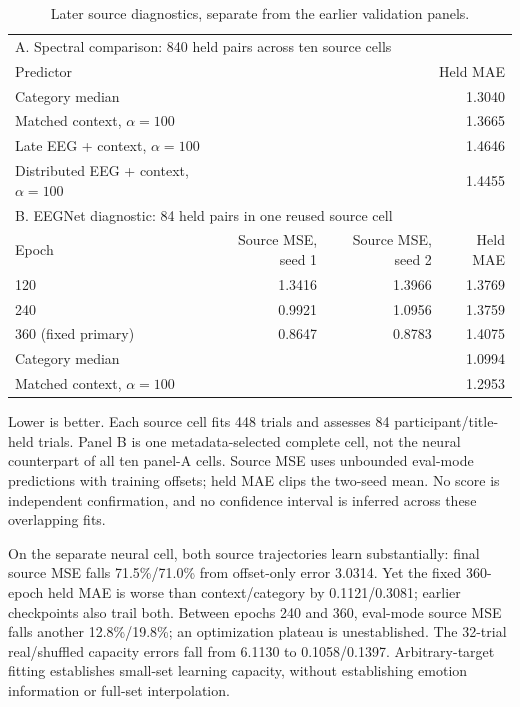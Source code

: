 \documentclass[10pt,letterpaper]{article}
\begin{document}
\begin{table}[!htbp]
\centering\small
\caption{Later source diagnostics, separate from the earlier validation panels.}
\label{tab:sourcefollowup}
\begin{tabular}{lrrr}
\toprule
\multicolumn{4}{l}{A. Spectral comparison: 840 held pairs across ten source cells}\\
Predictor & \multicolumn{3}{r}{Held MAE}\\
\midrule
Category median & \multicolumn{3}{r}{1.3040}\\
Matched context, $\alpha=100$ & \multicolumn{3}{r}{1.3665}\\
Late EEG + context, $\alpha=100$ & \multicolumn{3}{r}{1.4646}\\
Distributed EEG + context, $\alpha=100$ & \multicolumn{3}{r}{1.4455}\\
\midrule
\multicolumn{4}{l}{B. EEGNet diagnostic: 84 held pairs in one reused source cell}\\
Epoch & Source MSE, seed 1 & Source MSE, seed 2 & Held MAE\\
\midrule
120 & 1.3416 & 1.3966 & 1.3769\\
240 & 0.9921 & 1.0956 & 1.3759\\
360 (fixed primary) & 0.8647 & 0.8783 & 1.4075\\
\midrule
Category median & \multicolumn{3}{r}{1.0994}\\
Matched context, $\alpha=100$ & \multicolumn{3}{r}{1.2953}\\
\bottomrule
\end{tabular}
\par\medskip\begin{minipage}{0.97\linewidth}\footnotesize Lower is better. Each source cell fits 448 trials and assesses 84 participant/title-held trials. Panel B is one metadata-selected complete cell, not the neural counterpart of all ten panel-A cells. Source MSE uses unbounded eval-mode predictions with training offsets; held MAE clips the two-seed mean. No score is independent confirmation, and no confidence interval is inferred across these overlapping fits.\end{minipage}
\end{table}


On the separate neural cell, both source trajectories learn substantially: final source MSE falls 71.5\%/71.0\% from offset-only error 3.0314. Yet the fixed 360-epoch held MAE is worse than context/category by 0.1121/0.3081; earlier checkpoints also trail both. Between epochs 240 and 360, eval-mode source MSE falls another 12.8\%/19.8\%; an optimization plateau is unestablished. The 32-trial real/shuffled capacity errors fall from 6.1130 to 0.1058/0.1397. Arbitrary-target fitting establishes small-set learning capacity, without establishing emotion information or full-set interpolation.
\end{document}
